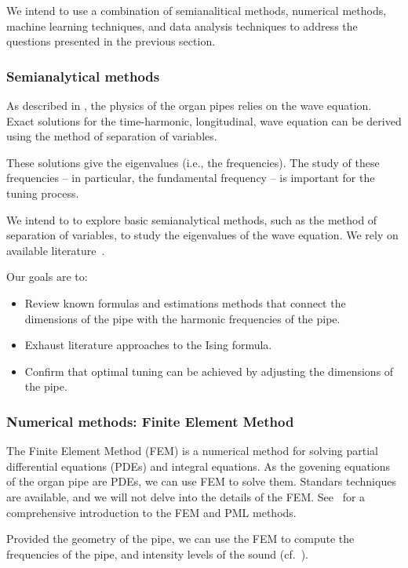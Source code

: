 \documentclass{psu-plan}
\begin{document}
We intend to use a combination of semianalitical methods, numerical methods,
machine learning techniques, and data analysis techniques to address the
questions presented in the previous section.

\subsubsection{Semianalytical methods}

As described in \autocite{2004RosFle-1}, the physics of the organ pipes relies
on the wave equation.
Exact solutions for the time-harmonic, longitudinal, wave equation can be
derived using the method of separation of variables.

These solutions give the eigenvalues (i.e., the frequencies). 
The study of these frequencies -- in particular, the fundamental
frequency -- is important for the tuning process.

We intend to to explore basic semianalytical methods, such as the method of
separation of variables, to study the eigenvalues of the wave equation.
We rely on available literature~\autocite{2004RosFle-1, 2012RosFle-1}.

Our goals are to:
\begin{itemize}
    \item Review known formulas and estimations methods that connect the
        dimensions of the pipe with the harmonic frequencies of the pipe.
    \item Exhaust literature approaches to the Ising formula.
    \item Confirm that optimal tuning can be achieved by adjusting the
        dimensions of the pipe.
\end{itemize}

\subsubsection{Numerical methods: Finite Element Method}

The Finite Element Method (FEM) is a numerical method for solving partial
differential equations (PDEs) and integral equations.
As the govening equations of the organ pipe are PDEs, we can use FEM to solve
them.
Standars techniques are available, and we will not delve into the details of the
FEM.
See~\autocite{2021ErnGue-1, 2021ErnGue-2, 2019VazKeeDem-1} for a
comprehensive introduction to the FEM and PML methods.

Provided the geometry of the pipe, we can use the FEM to compute the frequencies
of the pipe, and intensity levels of the sound
(cf.~\autocite[Figure 1]{2009RucAugFia-1}).
\end{document}
